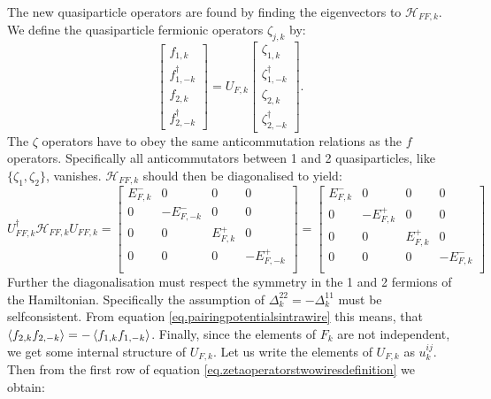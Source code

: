 The new quasiparticle operators are found by finding the eigenvectors to $\mathcal{H}_{FF,k}$. We define the quasiparticle fermionic operators $\zeta_{j,k}$ by:
\begin{equation}
\begin{bmatrix} f_{1,k} \\ f^\dagger_{1,-k} \\ f_{2,k} \\ f^\dagger_{2,-k} \end{bmatrix} = U_{F,k}\begin{bmatrix} \zeta_{1,k} \\ \zeta^{\dagger}_{1,-k} \\ \zeta_{2,k} \\ \zeta^{\dagger}_{2,-k} \end{bmatrix}.
\label{eq.zetaoperatorstwowiresdefinition}
\end{equation} 
The $\zeta$ operators have to obey the same anticommutation relations as the $f$ operators. Specifically all anticommutators between 1 and 2 quasiparticles, like $\{\zeta_1, \zeta_2 \} $, vanishes. $\mathcal{H}_{FF,k}$ should then be diagonalised to yield:
\begin{equation}
U^\dagger_{FF,k}\mathcal{H}_{FF,k}U_{FF,k} = \begin{bmatrix} 
E^{-}_{F,k} & 0        & 0       & 0        \\ 
0       & -E^{-}_{F,-k} & 0       & 0        \\ 
0       & 0        & E^{+}_{F,k} & 0        \\ 
0       & 0        & 0       & -E^{+}_{F,-k} \\ 
\end{bmatrix} = \begin{bmatrix} 
E^{-}_{F,k} & 0        & 0       & 0        \\ 
0       & -E^{+}_{F,k} & 0       & 0        \\ 
0       & 0        & E^{+}_{F,k} & 0        \\ 
0       & 0        & 0       & -E^{-}_{F,k} \\ 
\end{bmatrix} \nonumber
\end{equation}
Further the diagonalisation must respect the symmetry in the 1 and 2 fermions of the Hamiltonian. Specifically the assumption of $\Delta^{22}_k = -\Delta^{11}_k$ must be selfconsistent. From equation \ref{eq.pairingpotentialsintrawire} this means, that $\braket{f_{2,k}f_{2,-k}} = -\braket{f_{1,k}f_{1,-k}}$. Finally, since the elements of $F_k$ are not independent, we get some internal structure of $U_{F,k}$. Let us write the elements of $U_{F,k}$ as $u^{ij}_k$. Then from the first row of equation \eqref{eq.zetaoperatorstwowiresdefinition} we obtain: 
